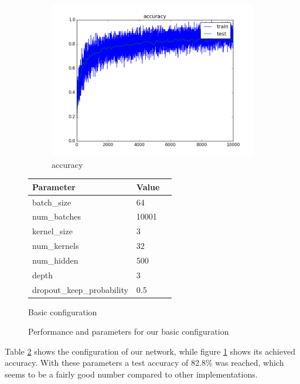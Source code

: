 \documentclass{article}
\begin{document}
\begin{enumerate}
\begin{enumerate}
		
		\begin{item}
		\begin{figure}
		\centering
			\begin{subfigure}[b]{0.45\textwidth}
				\includegraphics[width=\textwidth]{figures/accuracy_32kernels}
				\caption{accuracy}
				\label{fig:basic_accu}
			\end{subfigure}	
			\quad
			\begin{subtable}[b]{0.4\textwidth}
				\begin{tabular}{lll}
        					\toprule
        					Parameter     & Value \\
        					\midrule
        					batch\_size & 64  \\
        					num\_batches & 10001  \\
        					kernel\_size &3 \\
        					num\_kernels & 32 \\
        					num\_hidden & 500 \\
        					depth & 3 \\
        					dropout\_keep\_probability & 0.5 \\
        					\bottomrule
     				\end{tabular}
				\caption{Basic configuration}
				\label{basic_config}
			\end{subtable}
			\caption{Performance and parameters for our basic configuration}
		\end{figure}
		
		Table \ref{basic_config} shows the configuration of our network, while figure \ref{fig:basic_accu} shows its achieved accuracy.		
			With these parameters a test accuracy of 82.8\% was reached, which seems to be a fairly good number compared to other implementations.
			

\end{item}
\end{enumerate}
\end{enumerate}
\end{document}

